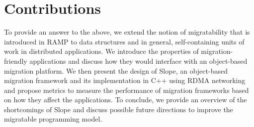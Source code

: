 \section{Contributions}
To provide an answer to the above, we extend the notion of migratability that is
introduced in RAMP \cite{memon2018ramp} to data structures and in general,
self-containing units of work in distributed applications.
We introduce
the properties of migration-friendly applications and discuss
how they would interface with an object-based migration platform.
We then present the design of Slope, an object-based migration framework
and its implementation in C++ using RDMA networking and propose metrics
to measure the performance of migration frameworks based on how they affect
the applications.
To conclude, we provide an overview of the shortcomings of Slope and
discuss possible future directions to improve the migratable programming model.

